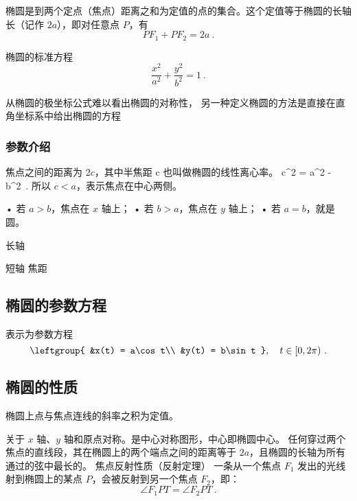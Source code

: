 椭圆是到两个定点（焦点）距离之和为定值的点的集合。这个定值等于椭圆的长轴长（记作 $2a$），即对任意点 $P$，有
\begin{equation}\label{eq_Elips3_9}
PF_1 + PF_2 = 2a ~.
\end{equation}

\begin{definition}{椭圆的标准方程}
\begin{equation}\label{eq_Elips3_3}
\frac{x^2}{a^2} + \frac{y^2}{b^2} = 1~.
\end{equation}
\end{definition}

从椭圆的极坐标公式难以看出椭圆的对称性， 另一种定义椭圆的方法是直接在直角坐标系中给出椭圆的方程

\subsubsection{参数介绍}


焦点之间的距离为 $2c$，其中半焦距 c 也叫做椭圆的线性离心率。
 c^2 = a^2 - b^2~. 
所以 $c < a$，表示焦点在中心两侧。

	•	若 $a > b$，焦点在 $x$ 轴上；
	•	若 $b > a$，焦点在 $y$ 轴上；
	•	若 $a = b$，就是圆。


长轴

短轴
焦距

\subsection{椭圆的参数方程}
表示为参数方程
\begin{equation}\label{eq_Elips3_1}
\leftgroup{
&x(t) = a\cos t\\
&y(t) = b\sin t
},\quad t \in [0, 2\pi) ~.
\end{equation}
\subsection{椭圆的性质}

椭圆上点与焦点连线的斜率之积为定值。

关于 $x$ 轴、$y$ 轴和原点对称。是中心对称图形，中心即椭圆中心。
任何穿过两个焦点的直线段，其在椭圆上的两个端点之间的距离等于 $2a$，且椭圆的长轴为所有通过的弦中最长的。
焦点反射性质（反射定理）
一条从一个焦点 $F_1$ 发出的光线射到椭圆上的某点 $P$，会被反射到另一个焦点 $F_2$，即：
\begin{equation}
\angle F_1PT = \angle F_2PT~.
\end{equation}

